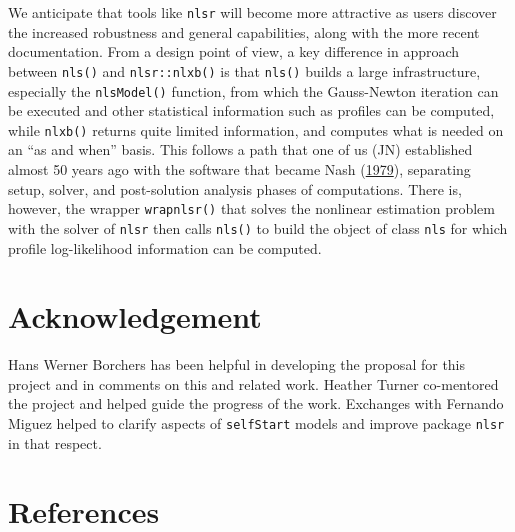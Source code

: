 \documentclass[
]{article}
\begin{document}
We anticipate that tools like \texttt{nlsr} will become more attractive
as users discover the increased robustness and general capabilities,
along with the more recent documentation. From a design point of view, a
key difference in approach between \texttt{nls()} and
\texttt{nlsr::nlxb()} is that \texttt{nls()} builds a large
infrastructure, especially the \texttt{nlsModel()} function, from which
the Gauss-Newton iteration can be executed and other statistical
information such as profiles can be computed, while \texttt{nlxb()}
returns quite limited information, and computes what is needed on an
``as and when'' basis. This follows a path that one of us (JN)
established almost 50 years ago with the software that became Nash
(\protect\hyperlink{ref-cnm79}{1979}), separating setup, solver, and
post-solution analysis phases of computations. There is, however, the
wrapper \texttt{wrapnlsr()} that solves the nonlinear estimation problem
with the solver of \texttt{nlsr} then calls \texttt{nls()} to build the
object of class \texttt{nls} for which profile log-likelihood
information can be computed.

\hypertarget{acknowledgement}{%
\section{Acknowledgement}\label{acknowledgement}}

Hans Werner Borchers has been helpful in developing the proposal for
this project and in comments on this and related work. Heather Turner
co-mentored the project and helped guide the progress of the work.
Exchanges with Fernando Miguez helped to clarify aspects of
\texttt{selfStart} models and improve package \texttt{nlsr} in that
respect.

\hypertarget{references}{%
\section*{References}\label{references}}
\end{document}
